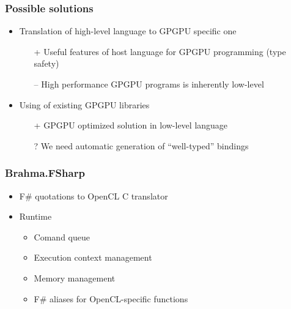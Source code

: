 \documentclass[xcolor=table]{beamer}
\begin{document}
\begin{frame}[fragile]
  \transwipe[direction=90]
  \frametitle{Possible solutions}
  \begin{itemize}
  \item Translation of high-level language to GPGPU specific one
    \begin{itemize}
  \item[+] Useful features of host language for GPGPU programming (type safety)
  \item[--] High performance GPGPU programs is inherently low-level
  \end{itemize}
  \item Using of existing GPGPU libraries
      \begin{itemize}
  \item[+] GPGPU optimized solution in low-level language
  \item[?] We need automatic generation of ``well-typed'' bindings
  \end{itemize}

  \end{itemize}
\end{frame}

\begin{frame}[fragile]
  \transwipe[direction=90]
  \frametitle{Brahma.FSharp}
  \begin{itemize}
  \item F\# quotations to OpenCL C translator
  \item Runtime
      \begin{itemize}
        \item Comand queue
        \item Execution context management
        \item Memory management
        \item F\# aliases for OpenCL-specific functions
      \end{itemize}

  \end{itemize}
\end{frame}
\end{document}
